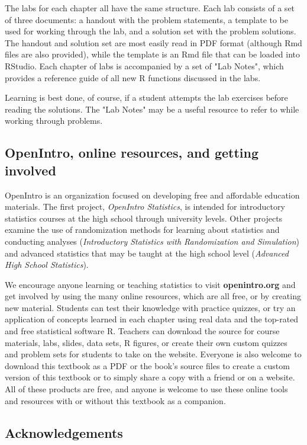 The labs for each chapter all have the same structure. Each lab consists of a set of three documents: a handout with the problem statements, a template to be used for working through the lab, and a solution set with the problem solutions. The handout and solution set are most easily read in PDF format (although Rmd files are also provided), while the template is an Rmd file that can be loaded into RStudio. Each chapter of labs is accompanied by a set of "Lab Notes", which provides a reference guide of all new \textsf{R} functions discussed in the labs.

Learning is best done, of course, if a student attempts the lab exercises before reading the solutions. The "Lab Notes" may be a useful resource to refer to while working through problems.

\subsection*{OpenIntro, online resources, and getting involved}

OpenIntro is an organization focused on developing free and affordable education materials. The first project, \emph{OpenIntro Statistics}, is intended for introductory statistics courses at the high school through university levels. Other projects examine the use of randomization methods for learning about statistics and conducting analyses (\emph{Introductory Statistics with Randomization and Simulation}) and advanced statistics that may be taught at the high school level (\emph{Advanced High School Statistics}).

We encourage anyone learning or teaching statistics to visit \textbf{openintro.org} and get involved by using the many online resources, which are all free, or by creating new material. Students can test their knowledge with practice quizzes, or try an application of concepts learned in each chapter using real data and the top-rated and free statistical software \textsf{R}. Teachers can download the source for course materials, labs, slides, data sets, \textsf{R} figures, or create their own custom quizzes and problem sets for students to take on the website. Everyone is also welcome to download this textbook as a PDF or the book's source files to create a custom version of this textbook or to simply share a copy with a friend or on a website. All of these products are free, and anyone is welcome to use these online tools and resources with or without this textbook as a companion.


\subsection*{Acknowledgements}


